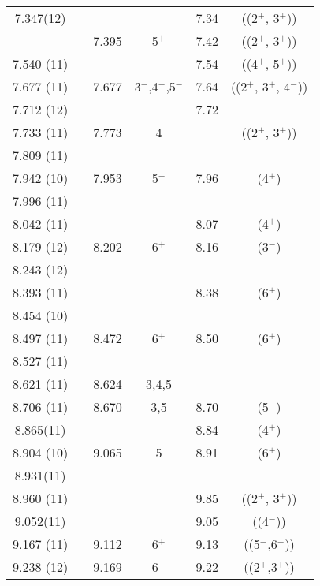 \begin{center}
\begin{longtable}{cc cc cc}
7.347(12)   &   &   &   & 7.34  & ((2$^+$, 3$^+$))          \\
  &   & 7.395 & 5$^+$ & 7.42  & ((2$^+$, 3$^+$))          \\
  7.540 (11)    &   &   &   & 7.54  & ((4$^+$, 5$^+$))          \\
  7.677 (11)    &   & 7.677 & 3$^-$,4$^-$,5$^-$ & 7.64  & ((2$^+$, 3$^+$, 4$^-$))   \\
  7.712 (12)    &   &   &   & 7.72  &                           \\
  7.733 (11)    &   & 7.773 & 4 &   & ((2$^+$, 3$^+$))          \\
  7.809 (11)    &   &   &   &   &                           \\
  7.942 (10)    &   & 7.953 & 5$^-$ & 7.96  & (4$^+$)                   \\
  7.996 (11)    &   &   &   &   &                           \\
  8.042 (11)    &   &   &   & 8.07  & (4$^+$)                   \\
  8.179 (12)    &   & 8.202 & 6$^+$ & 8.16  & (3$^-$)                   \\
  8.243 (12)    &   &   &   &   &                           \\
  8.393 (11)    &   &   &   & 8.38  & (6$^+$)                   \\
  8.454 (10)    &   &   &   &   &                           \\
  8.497 (11)    &   & 8.472 & 6$^+$ & 8.50  & (6$^+$)                   \\
  8.527 (11)    &   &   &   &   &                           \\
  8.621 (11)    &   & 8.624 & 3,4,5 &   &                           \\
  8.706 (11)    &   & 8.670 & 3,5 & 8.70  & (5$^-$)                   \\
   8.865(11)    &   &   &   & 8.84  & (4$^+$)                   \\
  8.904 (10)    &   & 9.065 & 5 & 8.91  & (6$^+$)                   \\
8.931(11) &   &   &   &   &                           \\
  8.960 (11)    &   &   &   & 9.85  & ((2$^+$, 3$^+$))          \\
   9.052(11)    &   &   &   & 9.05  & ((4$^-$))                 \\
  9.167 (11)    &   & 9.112 & 6$^+$ & 9.13  & ((5$^-$,6$^-$))           \\
  9.238 (12)    &   & 9.169 & 6$^-$ & 9.22  & ((2$^+$,3$^+$))           \\

\end{longtable}
\end{center}

